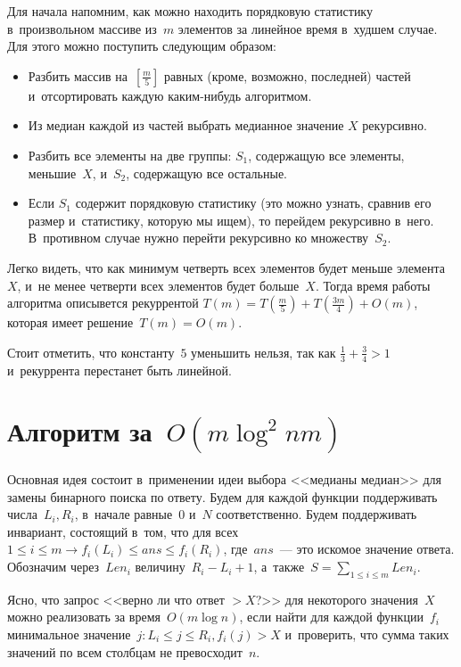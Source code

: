 \documentclass{article}
\renewcommand{\le}{\leqslant}
\begin{document}
Для начала напомним, как можно находить порядковую статистику в~произвольном
массиве из~$m$ элементов за линейное время в~худшем случае. Для этого можно
поступить следующим образом:

\begin{itemize}
  \item Разбить массив на~$\left[\frac{m}{5}\right]$ равных (кроме, возможно,
    последней) частей и~отсортировать каждую каким-нибудь алгоритмом.
  \item Из медиан каждой из частей выбрать медианное значение $X$ рекурсивно.
  \item Разбить все элементы на две группы: $S_1$, содержащую все элементы,
    меньшие~$X$, и~$S_2$, содержащую все остальные.
  \item Если $S_1$ содержит порядковую статистику (это можно узнать, сравнив его
    размер и~статистику, которую мы ищем), то перейдем рекурсивно в~него.
    В~противном случае нужно перейти рекурсивно ко множеству~$S_2$.
\end{itemize}

Легко видеть, что как минимум четверть всех элементов будет меньше элемента~$X$,
и~не менее четверти всех элементов будет больше~$X$. Тогда время работы
алгоритма описывется рекуррентой $T(m) = T(\frac{m}{5}) + T(\frac{3m}{4}) +
O(m)$, которая имеет решение~$T(m) = O(m)$.

Стоит отметить, что константу~$5$ уменьшить нельзя, так как $\frac{1}{3} +
\frac{3}{4} > 1$ и~рекуррента перестанет быть линейной.

\section{Алгоритм за~$O(m \log^2 nm)$}

Основная идея состоит в~применении идеи выбора <<медианы медиан>> для замены
бинарного поиска по ответу. Будем для каждой функции поддерживать числа~$L_i,
R_i$, в~начале равные~$0$ и~$N$ соответственно. Будем поддерживать инвариант,
состоящий в~том, что для всех $1 \le i \le m \rightarrow f_i(L_i) \le ans \le
f_i(R_i)$, где~$ans$~--- это искомое значение ответа. Обозначим
через~$Len_i$ величину~$R_i - L_i + 1$, а~также~$S = \sum\limits_{1\le i\le m}
Len_i$.

Ясно, что запрос <<верно ли что ответ $> X$?>> для некоторого значения~$X$ можно
реализовать за время~$O(m \log n)$, если найти для каждой функции~$f_i$
минимальное значение~$j: L_i \le j \le R_i, f_i(j) > X$ и~проверить, что сумма
таких значений по всем столбцам не превосходит~$n$.
\end{document}
